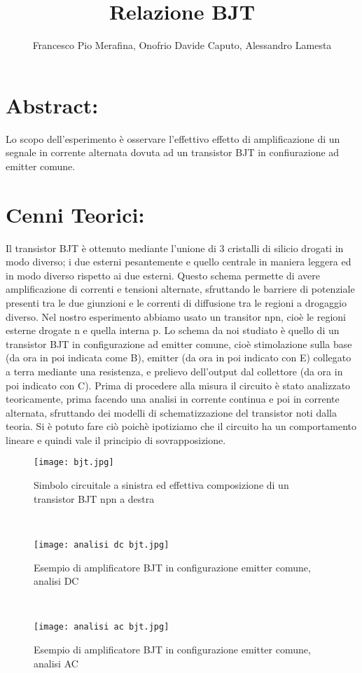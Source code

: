 \documentclass{article}
\title{Relazione BJT}
\author{Francesco Pio Merafina, Onofrio Davide Caputo, Alessandro Lamesta}
\begin{document}
\maketitle

\section{Abstract:}
Lo scopo dell'esperimento è osservare l'effettivo effetto di amplificazione di un segnale in corrente alternata dovuta ad un transistor BJT in confiurazione ad emitter comune.
~
\section{Cenni Teorici:}
Il transistor BJT è ottenuto mediante l'unione di 3 cristalli di silicio drogati in modo diverso; i due esterni pesantemente e quello centrale in maniera leggera ed in modo diverso rispetto ai due esterni. Questo schema permette di avere amplificazione di correnti e tensioni alternate, sfruttando le barriere di potenziale presenti tra le due giunzioni e le correnti di diffusione tra le regioni a drogaggio diverso. Nel nostro esperimento abbiamo usato un transitor npn, cioè le regioni esterne drogate n e quella interna p. Lo schema da noi studiato è quello di un transistor BJT in configurazione ad emitter comune, cioè stimolazione sulla base (da ora in poi indicata come B), emitter (da ora in poi indicato con E) collegato a terra mediante una resistenza, e prelievo dell'output dal collettore (da ora in poi indicato con C). Prima di procedere alla misura il circuito è stato analizzato teoricamente, prima facendo una analisi in corrente continua e poi in corrente alternata, sfruttando dei modelli di schematizzazione del transistor noti dalla teoria.
Si è potuto fare ciò poichè ipotiziamo che il circuito ha un comportamento lineare e quindi vale il principio di sovrapposizione.
~
\begin{figure}[h!]
    \centering
    \texttt{[image: bjt.jpg]}
    \caption{Simbolo circuitale a sinistra ed effettiva composizione di un transistor BJT npn a destra}
    \label{figura1}
\end{figure}
~
\begin{figure}[h!]
    \centering
    \texttt{[image: analisi dc bjt.jpg]}
    \caption{Esempio di amplificatore BJT in configurazione emitter comune, analisi DC}
    \label{figura1}
\end{figure}
~
\begin{figure}[h!]
    \centering
    \texttt{[image: analisi ac bjt.jpg]} 
    \caption{Esempio di amplificatore BJT in configurazione emitter comune, analisi AC}
    \label{figura1}
\end{figure}
~
\end{document}
